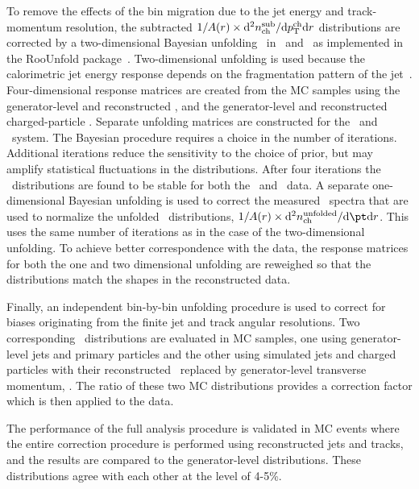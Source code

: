 To remove the effects of the bin migration due to the jet energy and track-momentum resolution, the subtracted $1/A(r) \times \mathrm{d}^2 \mbox{$n_{\mathrm{ch}}^{\mathrm{sub}}$} /\mathrm{d}\mbox{$p_{\mathrm{T}}^{\mathrm{ch}}$} \mathrm{d} r$ distributions are corrected by a two-dimensional Bayesian unfolding~\cite{DAgostini:1994zf}
in \pttrk\ and \ptjet\ as implemented in the RooUnfold package~\cite{Adye:2011gm}.  
Two-dimensional unfolding is used because the calorimetric jet energy response depends on the fragmentation pattern of the jet~\cite{Aad:2011he}.
Four-dimensional response matrices are created from the MC samples using the generator-level and reconstructed \ptjet, and the generator-level and reconstructed charged-particle \pttrk. Separate unfolding matrices are constructed for the \pp\ and \PbPb\ system. The Bayesian procedure requires a choice in the number of iterations.
Additional iterations reduce the sensitivity to the choice of prior, but may
amplify statistical fluctuations in the distributions.
After four iterations the 
\Dptr\ distributions are found to be stable for both the \PbPb\ and \pp\ data. 
A separate one-dimensional Bayesian unfolding is used to correct the measured \ptjet\ spectra that are used to normalize the unfolded \Dptr\ distributions, $1/A(r) \times \fd^2 \nchunf / \fd \pt \fd r $. This uses the same number of iterations as in the case of the two-dimensional unfolding. To achieve better correspondence with the data, the response matrices for both the one and two dimensional unfolding are reweighed so that the distributions match the shapes in the reconstructed data.

Finally, an independent bin-by-bin unfolding procedure is used to correct for biases originating from the finite jet and track angular resolutions. Two corresponding \Dptr\ distributions are evaluated in MC samples, one using generator-level jets and primary particles and the other using simulated jets and charged particles with their reconstructed \pttrk\ replaced by generator-level transverse momentum, \pTtrue. The ratio of these two MC distributions provides a correction factor which is then applied to the data. 


The performance of the full analysis procedure is validated in MC events where the entire correction procedure is performed using reconstructed jets and tracks, and the results are compared to the generator-level distributions. These distributions agree with each other at the level of 4-5\%.

